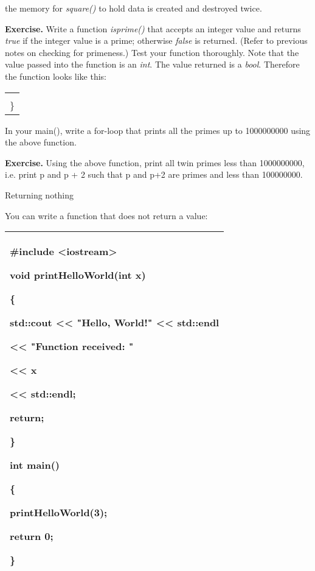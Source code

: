 \documentclass[
]{article}
\begin{document}
the memory for \emph{square()} to hold data is created and destroyed
twice.

\textbf{Exercise.} Write a function \emph{isprime()} that accepts an
integer value and returns \emph{true} if the integer value is a prime;
otherwise \emph{false} is returned. (Refer to previous notes on checking
for primeness.) Test your function thoroughly. Note that the value
passed into the function is an \emph{int}. The value returned is a
\emph{bool}. Therefore the function looks like this:

\begin{longtable}[]{@{}l@{}}
\toprule
\endhead
\begin{minipage}[t]{0.97\columnwidth}\raggedright
bool isprime(int n)

\{

...\\
\}\strut
\end{minipage}\tabularnewline
\bottomrule
\end{longtable}

In your main(), write a for-loop that prints all the primes up to
1000000000 using the above function.

\textbf{Exercise.} Using the above function, print all twin primes less
than 1000000000, i.e. print p and p + 2 such that p and p+2 are primes
and less than 100000000.

Returning nothing

You can write a function that does not return a value:

\begin{longtable}[]{@{}l@{}}
\toprule
\endhead
\begin{minipage}[t]{0.97\columnwidth}\raggedright
\#include \textless iostream\textgreater{}

\textbf{void} printHelloWorld(int x)

\{

std::cout \textless\textless{} "Hello, World!" \textless\textless{}
std::endl

\textless\textless{} "Function received: "

\textless\textless{} x

\textless\textless{} std::endl;

return;

\}

int main()

\{

printHelloWorld(3);

return 0;

\}\strut
\end{minipage}\tabularnewline
\bottomrule
\end{longtable}
\end{document}
